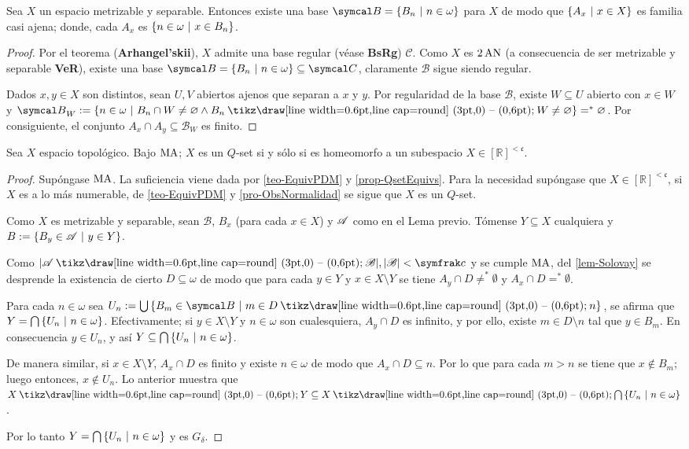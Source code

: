 \begin{lema}
	Sea $X$ un espacio metrizable y separable. Entonces existe una base $\mathcal{B}=\{B_n \tq n \in \omega\}$ para $X$ de modo que $\{A_x \text{ $|$ } x \in X\}$ es familia casi ajena; donde, cada $A_x$ es $\{n \in \omega \text{ $|$ } x \in B_n\}$.
\end{lema}
\begin{proof}
	Por el teorema (\textbf{Arhangel’skii}), $X$ admite una base regular (véase \textbf{BsRg}) $\mathcal{C}$. Como $X$ es $2\operatorname{AN}$ (a consecuencia de ser metrizable y separable \textbf{VeR}), existe una base $\mathcal{B}=\{B_n \tq n \in \omega\} \subseteq \mathcal{C}$, claramente $\mathcal{B}$ sigue siendo regular.

	Dados $x,y \in X$ son distintos, sean $U,V$ abiertos ajenos que separan a $x$ y $y$. Por regularidad de la base $\mathcal{B}$, existe $W \subseteq U$ abierto con $x\in W$ y
	$\mathcal{B}_W:=\{n \in \omega \tq B_n \cap W \neq \emptyset \land B_n \setminus W \neq \emptyset\} =^* \emptyset$. Por consiguiente, el conjunto $A_x \cap A_y \subseteq \mathcal{B}_W$ es finito.
\end{proof}

\begin{proposicion}\label{pro-MaQsetChar}
	Sea $X$ espacio topológico. Bajo $\operatorname{MA}$; $X$ es un $Q$-set si y sólo si es homeomorfo a un subespacio $X \in [\mathbb{R}]^{<\mathfrak{c}}$.
\end{proposicion}
\begin{proof}
	Supóngase $\operatorname{MA}$. La suficiencia viene dada por \ref{teo-EquivPDM} y \ref{prop-QsetEquivs}. Para la necesidad supóngase que $X \in [\mathbb{R}]^{<\mathfrak{c}}$, si $X$ es a lo más numerable, de \ref{teo-EquivPDM} y \ref{pro-ObsNormalidad} se sigue que $X$ es un $Q$-set.

	Como $X$ es metrizable y separable, sean $\mathcal{B}$, $B_x$ (para cada $x \in X$) y $\mathscr{A}$ como en el Lema previo. Tómense $Y \subseteq X$ cualquiera y $B:=\{B_y \in \mathscr{A} \text{ $|$ } y \in Y\}$.

	Como $|\ms{A} \setminus \ms{B}|,|\ms{B}|<\mathfrak{c}$ y se cumple $\operatorname{MA}$, del \autoref{lem-Solovay} se desprende la existencia de cierto $D \subseteq \omega$ de modo que para cada $y \in Y$ y $x \in X \setminus Y$ se tiene $A_y \cap D\neq ^*\emptyset$ y $A_x \cap D= ^*\emptyset$.

	Para cada $n \in \omega$ sea $U_n:=\midcup\{ B_m \in \mathcal{B} \tq m \in D \setminus n \}$, se afirma que $Y=\mbox{$\bigcap$}\,\{U_n \text{ $|$ } n \in \omega\}$. Efectivamente; si $y \in X \setminus Y$ y $n \in \omega$ son cualesquiera, $A_y \cap D$ es infinito, y por ello, existe $m \in D \setminus n$ tal que $y \in B_m$. En consecuencia $y \in U_n$, y así $Y \subseteq \mbox{$\bigcap$}\,\{U_n \text{ $|$ } n \in \omega\}$.

	De manera similar, si $x \in X \setminus Y$, $A_x \cap D$ es finito y existe $n \in \omega$ de modo que $A_x \cap D \subseteq n$. Por lo que para cada $m > n$ se tiene que $x \notin B_m$; luego entonces, $x \notin U_n$. Lo anterior muestra que $X \setminus Y \subseteq X \setminus \midcap\{U_n \tq n \in \omega\}$.

	Por lo tanto $Y=\mbox{$\bigcap$}\,\{U_n \text{ $|$ } n \in \omega\}$ y es $G_\delta$.
\end{proof}

